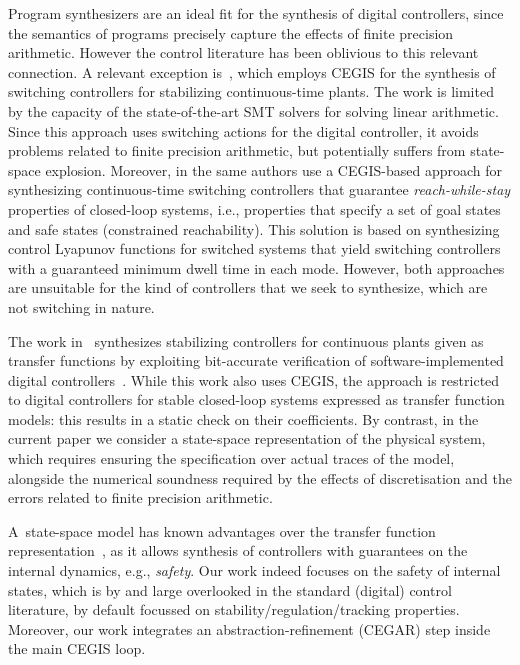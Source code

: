 
Program synthesizers are an ideal fit for the synthesis of digital controllers, 
since the semantics of programs precisely capture the effects of finite precision arithmetic.  
However the control literature has been oblivious to this relevant connection. 
A relevant exception is~\cite{DBLP:conf/cdc/RavanbakhshS15}, 
which employs CEGIS for the synthesis of switching controllers for stabilizing continuous-time
plants.  
The work 
is limited by the capacity of the state-of-the-art SMT solvers for solving
linear arithmetic.  Since this approach uses switching actions for the digital controller, it avoids problems related to
finite precision arithmetic, but potentially suffers from state-space
explosion.  Moreover, in \cite{DBLP:conf/emsoft/RavanbakhshS16} the same
authors use a CEGIS-based approach for synthesizing continuous-time
switching controllers that guarantee \emph{reach-while-stay} properties of
closed-loop systems, i.e., properties that specify a set of goal states and
safe states (constrained reachability).  This solution is based on
synthesizing control Lyapunov functions for switched systems that yield
switching controllers with a guaranteed minimum dwell time in each mode. 
However, both approaches are unsuitable for the kind of controllers that we seek to
synthesize, which are not switching in nature. 

The work in~\cite{hscc-paper} synthesizes stabilizing controllers for
continuous plants given as transfer functions by exploiting bit-accurate
verification of software-implemented digital controllers~\cite{Bessa16}. 
While this work also uses CEGIS, the approach is restricted to digital
controllers for stable closed-loop systems expressed as transfer function
models: this results in a static check on their coefficients.  By contrast,
in the current paper we consider a state-space representation of the
physical system, which requires ensuring the specification over actual
traces of the model, alongside the numerical soundness required by the
effects of discretisation and the errors related to finite precision arithmetic.  

A~state-space model has known advantages over the transfer function
representation~\cite{Franklin15}, as 
it allows synthesis of controllers with guarantees on the internal dynamics, e.g., 
\emph{safety}.  Our work indeed focuses on the safety of internal states, 
which is by and large overlooked in the standard (digital) control literature, 
by default focussed on stability/regulation/tracking properties.  
Moreover, our work integrates an abstraction-refinement (CEGAR) step inside the main CEGIS loop.

